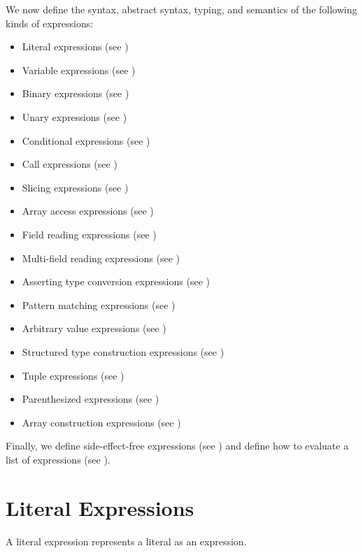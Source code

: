 We now define the syntax, abstract syntax, typing, and semantics of the following kinds of expressions:
\begin{itemize}
  \item Literal expressions (see )
  \item Variable expressions (see )
  \item Binary expressions (see )
  \item Unary expressions (see )
  \item Conditional expressions (see )
  \item Call expressions (see )
  \item Slicing expressions (see )
  \item Array access expressions (see )
  \item Field reading expressions (see )
  \item Multi-field reading expressions (see )
  \item Asserting type conversion expressions (see )
  \item Pattern matching expressions (see )
  \item Arbitrary value expressions (see )
  \item Structured type construction expressions (see )
  \item Tuple expressions (see )
  \item Parenthesized expressions (see )
  \item Array construction expressions (see )
\end{itemize}

Finally, we define side-effect-free expressions (see )
and define how to evaluate a list of expressions (see ).

\hypertarget{def-literalexpressionterm}{}
\section{Literal Expressions\label{sec:LiteralExpressions}}
A literal expression represents a literal as an expression.

